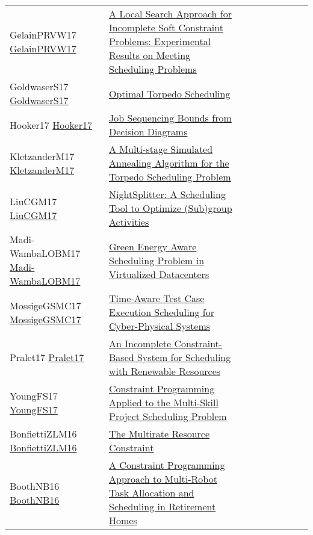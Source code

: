 {\begin{longtable}{p{3cm}p{7cm}lllllll}
GelainPRVW17 \href{https://doi.org/10.1007/978-3-319-59776-8\_32}{GelainPRVW17} &  \href{papers/GelainPRVW17.pdf}{A Local Search Approach for Incomplete Soft Constraint Problems: Experimental Results on Meeting Scheduling Problems} &  &  &  &  &  &  & \\
GoldwaserS17 \href{https://doi.org/10.1007/978-3-319-66158-2\_22}{GoldwaserS17} &  \href{papers/GoldwaserS17.pdf}{Optimal Torpedo Scheduling} &  &  &  &  &  &  & \\
Hooker17 \href{https://doi.org/10.1007/978-3-319-66158-2\_36}{Hooker17} &  \href{papers/Hooker17.pdf}{Job Sequencing Bounds from Decision Diagrams} &  &  &  &  &  &  & \\
KletzanderM17 \href{https://doi.org/10.1007/978-3-319-59776-8\_28}{KletzanderM17} &  \href{papers/KletzanderM17.pdf}{A Multi-stage Simulated Annealing Algorithm for the Torpedo Scheduling Problem} &  &  &  &  &  &  & \\
LiuCGM17 \href{https://doi.org/10.1007/978-3-319-66158-2\_24}{LiuCGM17} &  \href{papers/LiuCGM17.pdf}{NightSplitter: {A} Scheduling Tool to Optimize (Sub)group Activities} &  &  &  &  &  &  & \\
Madi-WambaLOBM17 \href{https://doi.org/10.1109/ICPADS.2017.00089}{Madi-WambaLOBM17} &  \href{papers/Madi-WambaLOBM17.pdf}{Green Energy Aware Scheduling Problem in Virtualized Datacenters} &  &  &  &  &  &  & \\
MossigeGSMC17 \href{https://doi.org/10.1007/978-3-319-66158-2\_25}{MossigeGSMC17} &  \href{papers/MossigeGSMC17.pdf}{Time-Aware Test Case Execution Scheduling for Cyber-Physical Systems} &  &  &  &  &  &  & \\
Pralet17 \href{https://doi.org/10.1007/978-3-319-66158-2\_16}{Pralet17} &  \href{papers/Pralet17.pdf}{An Incomplete Constraint-Based System for Scheduling with Renewable Resources} &  &  &  &  &  &  & \\
YoungFS17 \href{https://doi.org/10.1007/978-3-319-66158-2\_20}{YoungFS17} &  \href{papers/YoungFS17.pdf}{Constraint Programming Applied to the Multi-Skill Project Scheduling Problem} &  &  &  &  &  &  & \\
BonfiettiZLM16 \href{https://doi.org/10.1007/978-3-319-44953-1\_8}{BonfiettiZLM16} &  \href{papers/BonfiettiZLM16.pdf}{The Multirate Resource Constraint} &  &  &  &  &  &  & \\
BoothNB16 \href{https://doi.org/10.1007/978-3-319-44953-1\_34}{BoothNB16} &  \href{papers/BoothNB16.pdf}{A Constraint Programming Approach to Multi-Robot Task Allocation and Scheduling in Retirement Homes} &  &  &  &  &  &  & \\

\end{longtable}}

